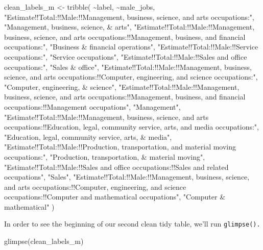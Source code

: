 \documentclass[
  krantz2]{krantz}
\makeatletter
\newenvironment{Shaded}{\begin{snugshade}}{\end{snugshade}}
\newcommand{\FunctionTok}[1]{\textcolor[rgb]{0,0,0}{#1}}
\newcommand{\NormalTok}[1]{#1}
\newcommand{\OtherTok}[1]{\textcolor[rgb]{0.37,0.37,0.37}{#1}}
\newcommand{\SpecialCharTok}[1]{\textcolor[rgb]{0,0,0}{#1}}
\newcommand{\StringTok}[1]{\textcolor[rgb]{0.5,0.5,0.5}{#1}}
\newenvironment{kframe}{%
\medskip{}
\setlength{\fboxsep}{.8em}
 \def\at@end@of@kframe{}%
 \ifinner\ifhmode%
  \def\at@end@of@kframe{\end{minipage}}%
  \begin{minipage}{\columnwidth}%
 \fi\fi%
 \def\FrameCommand##1{\hskip\@totalleftmargin \hskip-\fboxsep
 \colorbox{shadecolor}{##1}\hskip-\fboxsep
     \hskip-\linewidth \hskip-\@totalleftmargin \hskip\columnwidth}%
 \MakeFramed {\advance\hsize-\width
   \@totalleftmargin\z@ \linewidth\hsize
   \@setminipage}}%
 {\par\unskip\endMakeFramed%
 \at@end@of@kframe}
\renewenvironment{Shaded}{\begin{kframe}}{\end{kframe}}
\makeatother
\begin{document}
\begin{Shaded}
\begin{Highlighting}[]
\NormalTok{clean\_labels\_m }\OtherTok{\textless{}{-}} \FunctionTok{tribble}\NormalTok{(}
  \SpecialCharTok{\textasciitilde{}}\NormalTok{label, }\SpecialCharTok{\textasciitilde{}}\NormalTok{male\_jobs,}
  \StringTok{"Estimate!!Total:!!Male:!!Management, business, science, and arts occupations:"}\NormalTok{, }\StringTok{"Management, business, science, \& arts"}\NormalTok{,}
  \StringTok{"Estimate!!Total:!!Male:!!Management, business, science, and arts occupations:!!Management, business, and financial occupations:"}\NormalTok{, }\StringTok{"Business \& financial operations"}\NormalTok{,}
  \StringTok{"Estimate!!Total:!!Male:!!Service occupations:"}\NormalTok{, }\StringTok{"Service occupations"}\NormalTok{,}
  \StringTok{"Estimate!!Total:!!Male:!!Sales and office occupations:"}\NormalTok{, }\StringTok{"Sales \& office"}\NormalTok{,}
  \StringTok{"Estimate!!Total:!!Male:!!Management, business, science, and arts occupations:!!Computer, engineering, and science occupations:"}\NormalTok{, }\StringTok{"Computer, engineering, \& science"}\NormalTok{,}
  \StringTok{"Estimate!!Total:!!Male:!!Management, business, science, and arts occupations:!!Management, business, and financial occupations:!!Management occupations"}\NormalTok{, }\StringTok{"Management"}\NormalTok{, }
  \StringTok{"Estimate!!Total:!!Male:!!Management, business, science, and arts occupations:!!Education, legal, community service, arts, and media occupations:"}\NormalTok{, }\StringTok{"Education, legal, community service, arts, \& media"}\NormalTok{,}
  \StringTok{"Estimate!!Total:!!Male:!!Production, transportation, and material moving occupations:"}\NormalTok{, }\StringTok{"Production, transportation, \& material moving"}\NormalTok{,}
  \StringTok{"Estimate!!Total:!!Male:!!Sales and office occupations:!!Sales and related occupations"}\NormalTok{, }\StringTok{"Sales"}\NormalTok{,}
  \StringTok{"Estimate!!Total:!!Male:!!Management, business, science, and arts occupations:!!Computer, engineering, and science occupations:!!Computer and mathematical occupations"}\NormalTok{, }\StringTok{"Computer \& mathematical"}
\NormalTok{)}
\end{Highlighting}
\end{Shaded}

In order to see the beginning of our second clean tidy table, we'll run \texttt{glimpse().}

\begin{Shaded}
\begin{Highlighting}[]
\FunctionTok{glimpse}\NormalTok{(clean\_labels\_m)}
\end{Highlighting}
\end{Shaded}
\end{document}
